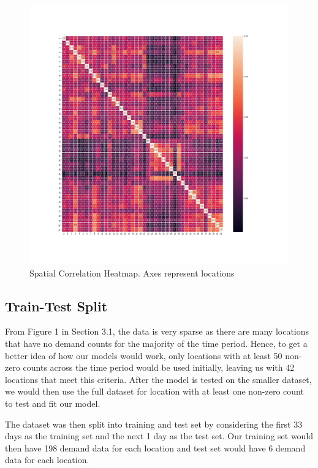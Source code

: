 \documentclass[12pt, letterpaper] {article}
\begin{document}
\begin{figure}[H]
    \centering
    \includegraphics[width=\textwidth, height=0.8\textheight]{Images/heatmap.jpg}
    \caption{Spatial Correlation Heatmap. Axes represent locations}
    \label{fig:Spatial Correlation Heatmap. Axes represent locations}
\end{figure}

\subsection{Train-Test Split}
From Figure 1 in Section 3.1, the data is very sparse as there are many locations that have no demand counts for the majority of the time period. Hence, to get a better idea of how our models would work, only locations with at least 50 non-zero counts across the time period would be used initially, leaving us with 42 locations that meet this criteria. After the model is tested on the smaller dataset, we would then use the full dataset for location with at least one non-zero count to test and fit our model. 

\noindent The dataset was then split into training and test set by considering the first 33 days as the training set and the next 1 day as the test set. Our training set would then have 198 demand data for each location and test set would have 6 demand data for each location. 
\end{document}
